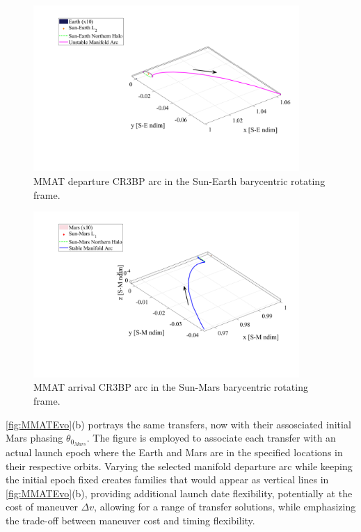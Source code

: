 \begin{figure}[H]
    \centering
    \includegraphics[width=0.9\textwidth]{figures/MinDvSE.pdf}
    \caption{MMAT departure CR3BP arc in the Sun-Earth barycentric rotating frame.}
    \label{fig:MMATSE}
\end{figure}

\begin{figure}[H]
    \centering
    \includegraphics[width=0.9\textwidth]{figures/MinDvSM.pdf}
    \caption{MMAT arrival CR3BP arc in the Sun-Mars barycentric rotating frame.}
    \label{fig:MMATSM}
\end{figure}

\cref{fig:MMATEvo}(b) portrays the same transfers, now with their assosciated initial Mars phasing
$\theta_{0_{Mars}}$. The figure is employed to associate each transfer with an actual launch epoch
where the Earth and Mars are in the specified locations in their respective orbits. Varying the
selected manifold departure arc while keeping the initial epoch fixed creates families that would
appear as vertical lines in \cref{fig:MMATEvo}(b), providing additional launch date flexibility,
potentially at the cost of maneuver $\Delta v$, allowing for a range of transfer solutions, while
emphasizing the trade-off between maneuver cost and timing flexibility.

